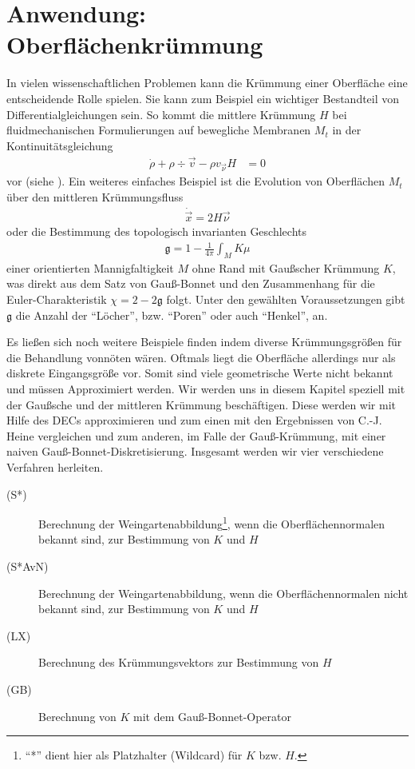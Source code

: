 \chapter{Anwendung: Oberflächenkrümmung}
  
  \begin{ziel}
    In vielen wissenschaftlichen Problemen kann die Krümmung
    einer Oberfläche eine entscheidende Rolle spielen. 
    Sie kann zum Beispiel ein wichtiger Bestandteil von Differentialgleichungen sein.
    So kommt die mittlere Krümmung \( H \) bei fluidmechanischen Formulierungen auf bewegliche Membranen 
    \( M_{t} \) in der
    Kontinuitätsgleichung
    \begin{align}
      \dot{\rho} + \rho\div\vec{v} - \rho v_{\vec{\nu}} H &= 0
    \end{align}
    vor (siehe \cite{desimone}).
    Ein weiteres einfaches Beispiel ist die Evolution von Oberflächen \( M_{t} \) über den mittleren
    Krümmungsfluss
    \begin{align}
      \dot{\vec{x}} = 2 H \vec{\nu} 
    \end{align}
    oder die Bestimmung des topologisch invarianten Geschlechts
    \begin{align}
      \mathfrak{g} = 1 - \frac{1}{4\pi}\int_{M}K\mu
    \end{align}
    einer orientierten Mannigfaltigkeit \( M \) ohne Rand mit Gaußscher Krümmung \( K \),
    was direkt aus dem Satz von Gauß-Bonnet 
    und den Zusammenhang für die Euler-Charakteristik \mbox{\( \chi = 2-2\mathfrak{g} \)} folgt.
    Unter den gewählten Voraussetzungen gibt \( \mathfrak{g} \) die Anzahl der "`Löcher"', bzw. "`Poren"' oder auch "`Henkel"', an.
    
    Es ließen sich noch weitere Beispiele finden indem diverse Krümmungsgrößen für die Behandlung vonnöten wären.
    Oftmals liegt die Oberfläche allerdings nur als diskrete Eingangsgröße vor. 
    Somit sind viele
    geometrische Werte nicht bekannt und müssen Approximiert werden.
    Wir werden uns in diesem Kapitel speziell mit der Gaußsche und der mittleren Krümmung beschäftigen.
    Diese werden wir mit Hilfe des DECs approximieren und zum einen mit den Ergebnissen von C.-J. Heine 
    \cite{heine} vergleichen und zum anderen, im Falle der Gauß-Krümmung, mit einer naiven 
    Gauß-Bonnet-Diskretisierung.
    Insgesamt werden wir vier verschiedene Verfahren herleiten.
    \begin{description}
      \item[(S*)] Berechnung der Weingartenabbildung\footnote{"`*"' dient hier als Platzhalter (Wildcard) für \( K \) bzw. \( H \).}, wenn die Oberflächennormalen bekannt sind, zur
              Bestimmung von \( K \) und \( H \)
      \item[(S*AvN)] Berechnung der Weingartenabbildung, wenn die Oberflächennormalen nicht bekannt sind, zur
              Bestimmung von \( K \) und \( H \)
      \item[(LX)] Berechnung des Krümmungsvektors zur Bestimmung von \( H \)
      \item[(GB)] Berechnung von \( K \) mit dem Gauß-Bonnet-Operator
    \end{description}
  \end{ziel}

